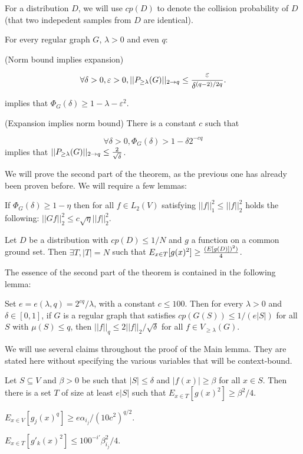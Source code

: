 For a distribution $D$, we will use $cp(D)$ to denote the collision probability of $D$ (that two indepedent samples from $D$ are identical).

 For every regular graph $G$, $\lambda > 0$ and
even $q$:

\itemize\ibull

\: (Norm bound implies expansion)

$$\forall \delta > 0, \varepsilon >0, ||P_{\ge \lambda}(G)||_{2 \rightarrow q} \le {\varepsilon \over \delta^{(q-2)/2q}}.$$

implies that $\Phi_G(\delta) \ge 1 - \lambda - \varepsilon^2$.

\: (Expansion implies norm bound) There is a constant $c$ such that

$$\forall \delta > 0, \Phi_G(\delta) > 1 - \delta 2^{-cq} $$
implies that $||P_{\ge \lambda}(G)||_{2 \rightarrow q} \le {2 \over \sqrt{\delta}}$.

\endlist

We will prove the second part of the theorem, as the previous one has
already been proven before. We will require a few lemmas:

 If $\Phi_G(\delta) \ge 1 - \eta$ then for all $f \in L_2(V)$ satisfying $||f||_1^2 \le ||f||_2^2$ holds the following: $||Gf||_2^2 \le c\sqrt{\eta} ||f||_2^2$.

\lem{} Let $D$ be a distribution with $cp(D) \le 1/N$ and $g$ a function on a common ground set. Then $\exists T, |T| = N$ such that $E_{x \in T}[g(x)^2] \ge {(E[g(D)])^2) \over 4}$.

The essence of the second part of the theorem is contained in the following lemma:

 Set $e = e(\lambda,q) = 2^{cq}/\lambda$, with a constant $c \le 100$. Then for every $\lambda > 0$ and $\delta \in [0,1]$, if $G$ is a regular graph that satisfies $cp(G(S)) \le 1/(e|S|)$ for all $S$ with $\mu(S) \le q$, then $||f||_q \le 2||f||_2 / \sqrt{\delta}$ for all $f \in V_{\ge \lambda}(G)$.

We will use several claims throughout the proof of the Main lemma. They are stated here without specifying the various variables that will be context-bound.

\lclaim{} Let $S \subseteq V$ and $\beta > 0$ be such that $|S| \le \delta$ and $|f(x)| \ge \beta$ for all $x \in S$. Then there is a set $T$ of size at least $e|S|$ such that $E_{x \in T}[g(x)^2] \ge \beta^2/4$.

\lclaim{} $E_{x \in V}[g_j(x)^q] \ge e \alpha_{i_j}/(10c^2)^{q/2}$.

 $E_{x \in T}[g'_{k}(x)^2] \le 100^{-i'} \beta_{i_j}^2 / 4$.

\bye
